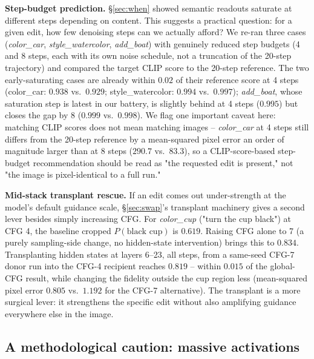 \documentclass[10pt,twocolumn,letterpaper]{article}
\begin{document}
\textbf{Step-budget prediction.} \S\ref{sec:when} showed semantic readouts saturate at
different steps depending on content. This suggests a practical
question: for a given edit, how few denoising steps can we actually
afford? We re-ran three cases (\emph{color\_car}, \emph{style\_watercolor},
\emph{add\_boat}) with genuinely reduced step budgets (4 and 8 steps,
each with its own noise schedule, not a truncation of the 20-step
trajectory) and compared the target CLIP score to the 20-step
reference. The two early-saturating cases are already within $0.02$ of
their reference score at 4 steps (color\_car: $0.938$ vs.\ $0.929$;
style\_watercolor: $0.994$ vs.\ $0.997$); \emph{add\_boat}, whose
saturation step is latest in our battery, is slightly behind at 4 steps
($0.995$) but closes the gap by 8 ($0.999$ vs.\ $0.998$). We flag one
important caveat here: matching CLIP scores does not mean matching
images -- \emph{color\_car} at 4 steps still differs from the 20-step
reference by a mean-squared pixel error an order of magnitude larger
than at 8 steps ($290.7$ vs.\ $83.3$), so a CLIP-score-based step-budget
recommendation should be read as "the requested edit is present," not
"the image is pixel-identical to a full run."

\textbf{Mid-stack transplant rescue.} If an edit comes out under-strength
at the model's default guidance scale, \S\ref{sec:swap}'s transplant
machinery gives a second lever besides simply increasing CFG. For
\emph{color\_cup} ("turn the cup black") at CFG 4, the baseline cropped
$P(\text{black cup})$ is $0.619$. Raising CFG alone to 7 (a purely
sampling-side change, no hidden-state intervention) brings this to
$0.834$. Transplanting hidden states at layers 6--23, all steps, from a
same-seed CFG-7 donor run into the CFG-4 recipient reaches $0.819$ --
within $0.015$ of the global-CFG result, while changing the fidelity
outside the cup region less (mean-squared pixel error $0.805$ vs.\
$1.192$ for the CFG-7 alternative). The transplant is a more surgical
lever: it strengthens the specific edit without also amplifying
guidance everywhere else in the image.

\subsection{A methodological caution: massive activations}\label{sec:massive}
\end{document}
